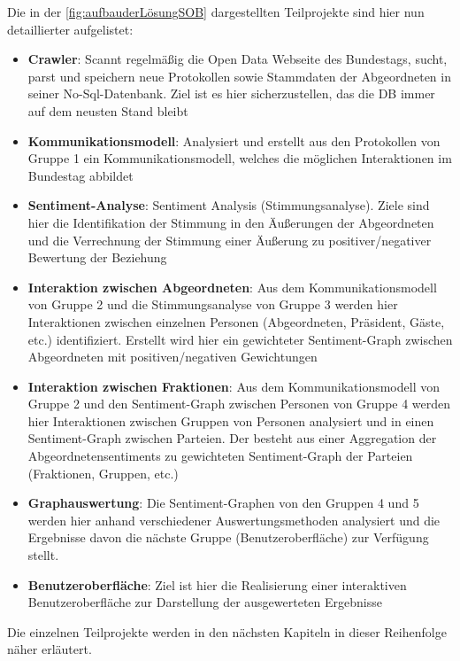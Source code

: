 Die in der \autoref{fig:aufbauderLösungSOB} dargestellten Teilprojekte sind hier nun detaillierter aufgelistet:
\begin{itemize}
    \item \textbf{Crawler}: Scannt regelmäßig die Open Data Webseite des Bundestags, sucht, parst und speichern neue Protokollen sowie Stammdaten der Abgeordneten in seiner No-Sql-Datenbank. Ziel ist es hier sicherzustellen, das die DB immer auf dem neusten Stand bleibt
    \item \textbf{Kommunikationsmodell}: Analysiert und erstellt aus den
      Protokollen von Gruppe 1 ein Kommunikationsmodell, welches die möglichen
      Interaktionen im Bundestag abbildet
    \item \textbf{Sentiment-Analyse}: Sentiment Analysis (Stimmungsanalyse). Ziele sind hier die Identifikation der Stimmung in den Äußerungen der Abgeordneten und die Verrechnung der Stimmung einer Äußerung zu positiver/negativer Bewertung der Beziehung
    \item \textbf{Interaktion zwischen Abgeordneten}: Aus dem Kommunikationsmodell von Gruppe 2 und die Stimmungsanalyse von Gruppe 3 werden hier Interaktionen zwischen einzelnen Personen (Abgeordneten, Präsident, Gäste, etc.) identifiziert. Erstellt wird hier ein gewichteter Sentiment-Graph zwischen Abgeordneten mit positiven/negativen Gewichtungen
    \item \textbf{Interaktion zwischen Fraktionen}: Aus dem Kommunikationsmodell von Gruppe 2 und den Sentiment-Graph zwischen Personen von Gruppe 4 werden hier Interaktionen zwischen Gruppen von Personen analysiert und in einen Sentiment-Graph zwischen Parteien. Der besteht aus einer Aggregation der Abgeordnetensentiments zu gewichteten Sentiment-Graph der Parteien (Fraktionen, Gruppen, etc.)
    \item \textbf{Graphauswertung}: Die Sentiment-Graphen von den Gruppen 4 und 5 werden hier anhand verschiedener Auswertungsmethoden analysiert und die Ergebnisse davon die nächste Gruppe (Benutzeroberfläche) zur Verfügung stellt.
    \item \textbf{Benutzeroberfläche}: Ziel ist hier die Realisierung einer interaktiven Benutzeroberfläche zur Darstellung der ausgewerteten Ergebnisse
\end{itemize}

Die einzelnen Teilprojekte werden in den nächsten Kapiteln in dieser Reihenfolge näher erläutert.